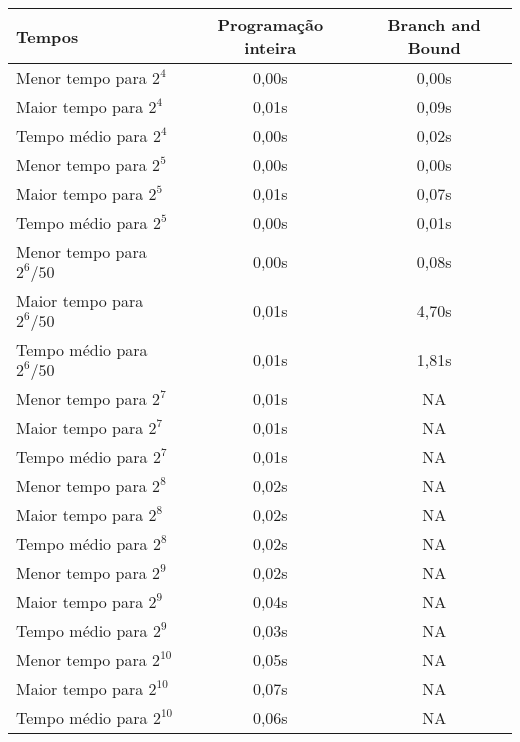 \begin{center}
  \bgroup {}
  \begin{table}
    \begin{tabular}{| l | c | c |}
      \hline Tempos & Programação inteira & Branch and Bound \\ \hline
      \hline Menor tempo para $2^4$ & 0,00s & 0,00s \\ Maior tempo
      para $2^4$ & 0,01s & 0,09s \\ Tempo médio para $2^4$ & 0,00s &
                                                                     0,02s \\ \hline

      Menor tempo para $2^5$ & 0,00s & 0,00s \\ Maior tempo para $2^5$
                    & 0,01s & 0,07s \\ Tempo médio para $2^5$ & 0,00s & 0,01s
      \\ \hline

      Menor tempo para $2^6/50$ & 0,00s & 0,08s \\ Maior tempo para
      $2^6/50$ & 0,01s & 4,70s \\ Tempo médio para $2^6/50$ & 0,01s &
                                                                     1,81s \\ \hline

      Menor tempo para $2^7$ & 0,01s & NA \\ Maior tempo para $2^7$ &
                                                                      0,01s & NA \\ Tempo médio para $2^7$ & 0,01s & NA \\ \hline

      Menor tempo para $2^8$ & 0,02s & NA \\ Maior tempo para $2^8$ &
                                                                      0,02s & NA \\ Tempo médio para $2^8$ & 0,02s & NA \\ \hline

      Menor tempo para $2^9$ & 0,02s & NA \\ Maior tempo para $2^9$ &
                                                                      0,04s & NA \\ Tempo médio para $2^9$ & 0,03s & NA \\ \hline

      Menor tempo para $2^{10}$ & 0,05s & NA \\ Maior tempo para
      $2^{10}$ & 0,07s & NA \\ Tempo médio para $2^{10}$ & 0,06s & NA
      \\ \hline


\end{tabular}
\end{table}
\end{center}
